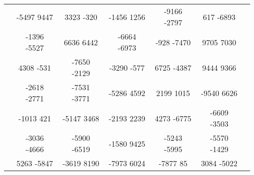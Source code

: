 \begin{landscape}
\begin{table}[]
\begin{tabular}{|c|ccccc|c|}
                     & -5497 9447 & 3323 -320 & -1456 1256 & -9166 -2797 & 617 -6893 & 		 \\
                     & -1396 -5527 & 6636 6442 & -6664 -6973 & -928 -7470 & 9705 7030 & 		 \\
                     & 4308 -531 & -7650 -2129 & -3290 -577 & 6725 -4387 & 9444 9366 & 		 \\
                     & -2618 -2771 & -7531 -3771 & -5286 4592 & 2199 1015 & -9540 6626 & 		 \\
                     & -1013 421 & -5147 3468 & -2193 2239 & 4273 -6775 & -6609 -3503 & 		 \\
                     & -3036 -4666 & -5900 -6519 & -1580 9425 & -5243 -5995 & -5570 -1429 & 		 \\
                     & 5263 -5847 & -3619 8190 & -7973 6024 & -7877 85 & 3084 -5022 & 		 \\ \hline            
        \end{tabular}
    \end{table}
\end{landscape}
